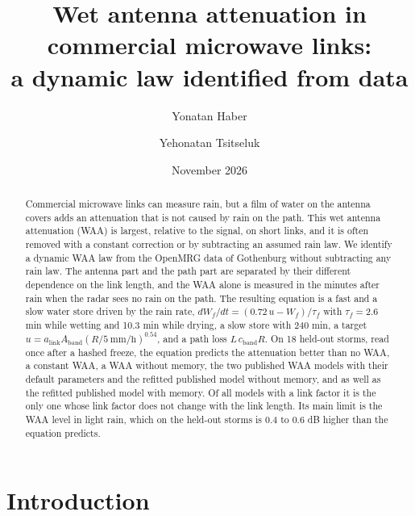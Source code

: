 \documentclass[reprint,aps,pra,amsmath,amssymb,nofootinbib,superscriptaddress]{revtex4-2}
\newcommand{\alink}{a_{\mathrm{link}}}
\newcommand{\Aband}{A_{\mathrm{band}}}
\newcommand{\cband}{c_{\mathrm{band}}}
\begin{document}
\title{Wet antenna attenuation in commercial microwave links:\\ a dynamic law identified from data}

\author{Yonatan Haber}
\author{Yehonatan Tsitseluk}
\date{November 2026}

\begin{abstract}
Commercial microwave links can measure rain, but a film of water on the antenna covers adds an attenuation that is not
caused by rain on the path. This wet antenna attenuation (WAA) is largest, relative to the signal, on short links, and it
is often removed with a constant correction or by subtracting an assumed rain law. We identify a dynamic WAA law from the
OpenMRG data of Gothenburg without subtracting any rain law. The antenna part and the path part are separated by their
different dependence on the link length, and the WAA alone is measured in the minutes after rain when the radar sees no
rain on the path. The resulting equation is a fast and a slow water store driven by the rain rate, $dW_f/dt = (0.72\,u -
W_f)/\tau_f$ with $\tau_f = 2.6$ min while wetting and 10.3 min while drying, a slow store with 240 min, a target $u =
\alink \Aband (R/5\ \mathrm{mm/h})^{0.54}$, and a path loss $L\,\cband R$. On 18 held-out storms, read once after a hashed
freeze, the equation predicts the attenuation better than no WAA, a constant WAA, a WAA without memory, the two published
WAA models with their default parameters and the refitted published model without memory, and as well as the refitted
published model with memory. Of all models with a link factor it is the only one whose link factor does not change with
the link length. Its main limit is the WAA level in light rain, which on the held-out storms is 0.4 to 0.6 dB higher than
the equation predicts.
\end{abstract}

\maketitle

\section{Introduction}
\end{document}
